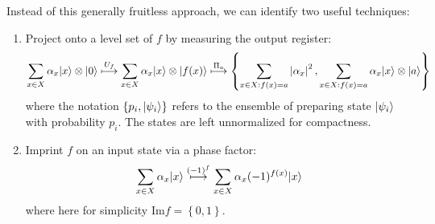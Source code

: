 \documentclass[]{article}
\newcommand{\modulus}[1]{\left\vert#1\right\vert}
\newcommand{\set}[1]{\left\lbrace#1\right\rbrace}
\theoremstyle{plain}
\theoremstyle{definition}
\theoremstyle{remark}
\begin{document}
Instead of this generally fruitless approach, we can identify two useful techniques:
\begin{enumerate}
\item Project onto a level set of $f$ by measuring the output register:
\begin{equation}
\sum_{x\in X}\alpha_x\ket{x}\otimes\ket{0}\overset{U_f}{\longmapsto}\sum_{x\in X}\alpha_x\ket{x}\otimes\ket{f(x)}\overset{\Pi_{a}}{\longmapsto}\set{\sum_{x\in X:f(x)=a}\modulus{\alpha_x}^2,\sum_{x\in X:f(x)=a}\alpha_x\ket{x}\otimes\ket{a}}
\end{equation}
where the notation $\set{p_i,\ket{\psi_i}}$ refers to the ensemble of preparing state ${\left\vert{\psi_i}\right\rangle}$ with probability $p_i$. The states are left unnormalized for compactness.

\item Imprint $f$ on an input state via a phase factor:
\begin{equation}
\sum_{x\in X}\alpha_x{\left\vert{x}\right\rangle}\overset{(-1)^f}{\longmapsto}\sum_{x\in X}\alpha_x(-1)^{f(x)}{\left\vert{x}\right\rangle}
\end{equation}
where here for simplicity $\text{Im} f=\set{0,1}$.
\end{enumerate}
\end{document}
